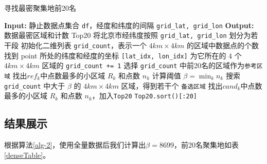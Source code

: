 \documentclass[UTF8]{ctexart}
\begin{document}
\begin{algorithm}[htb]
    \caption{寻找最密聚集地前20名}
    \label{alg-2}
    \begin{algorithmic}[1]
    \STATE \textbf{Input:} 静止数据点集合 \texttt{df}，经度和纬度的间隔 \texttt{grid\_lat, grid\_lon}
    \STATE \textbf{Output:} 数据最密区域和计数 {Top20}
    \STATE 将北京市经纬度按照 \texttt{grid\_lat, grid\_lon} 划分为若干段
    \STATE 初始化二维列表 \texttt{grid\_count}，表示一个 $4km \times 4km$ 的区域中数据点的个数
        \STATE 找到 point 所处的纬度和经度的坐标 \texttt{[lat\_idx, lon\_idx]}
        \STATE 为它所在的 $4$ 个 $4km \times 4km$ 区域的 \texttt{grid\_count += 1} 
    \ENDFOR
    \STATE 选择 \texttt{grid\_count} 中前20名的区域作为\texttt{参考区域}
            \STATE 找出$ref_k$中点数最多的小区域 $R_k$ 和点数 $n_k$
        \ENDFOR
    \ENDFOR
    \STATE  计算阈值 $\beta = \min_{k}{n_k}$
    \STATE 搜索 \texttt{grid\_count} 中大于 $\beta$ 的 $4km \times 4km$ 区域，得到若干个 \texttt{备选区域}
            \STATE 找出$cand_k$中点数最多的小区域 $R_k$ 和点数 $n_k$，加入\texttt{Top20}
        \ENDFOR
    \ENDFOR
    \RETURN \texttt{Top20.sort()[:20]}
    \end{algorithmic}
\end{algorithm}

\subsection{结果展示}

根据算法\ref{alg-2}，使用全量数据后我们计算出$\beta =8699$，前20名聚集地如表\ref{denseTable}。
\end{document}

